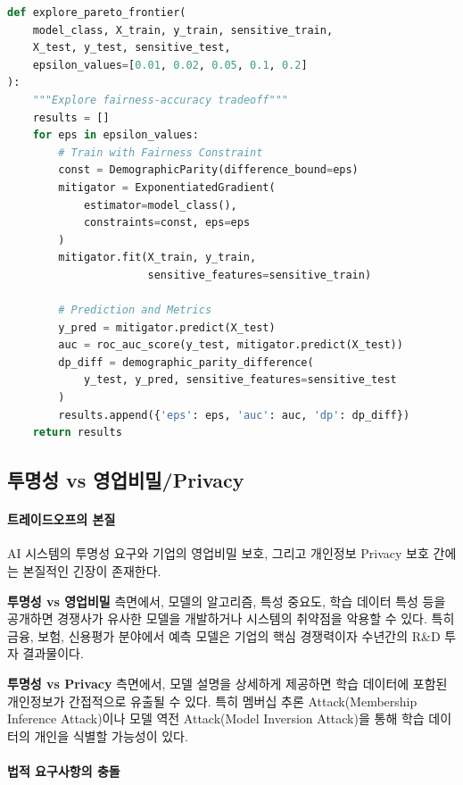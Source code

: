 \begin{lstlisting}[language=Python, caption={Pareto Frontier Exploration}, label={lst:pareto_search}]
def explore_pareto_frontier(
    model_class, X_train, y_train, sensitive_train,
    X_test, y_test, sensitive_test,
    epsilon_values=[0.01, 0.02, 0.05, 0.1, 0.2]
):
    """Explore fairness-accuracy tradeoff"""
    results = []
    for eps in epsilon_values:
        # Train with Fairness Constraint
        const = DemographicParity(difference_bound=eps)
        mitigator = ExponentiatedGradient(
            estimator=model_class(),
            constraints=const, eps=eps
        )
        mitigator.fit(X_train, y_train, 
                      sensitive_features=sensitive_train)
        
        # Prediction and Metrics
        y_pred = mitigator.predict(X_test)
        auc = roc_auc_score(y_test, mitigator.predict(X_test))
        dp_diff = demographic_parity_difference(
            y_test, y_pred, sensitive_features=sensitive_test
        )
        results.append({'eps': eps, 'auc': auc, 'dp': dp_diff})
    return results
\end{lstlisting}


\subsection{투명성 vs 영업비밀/Privacy}
\label{sec:3.2.2}

\paragraph{트레이드오프의 본질}

AI 시스템의 투명성 요구와 기업의 영업비밀 보호, 
그리고 개인정보 Privacy 보호 간에는 본질적인 긴장이 존재한다.

\textbf{투명성 vs 영업비밀} 측면에서, 
모델의 알고리즘, 특성 중요도, 학습 데이터 특성 등을 공개하면 
경쟁사가 유사한 모델을 개발하거나 시스템의 취약점을 악용할 수 있다. 
특히 금융, 보험, 신용평가 분야에서 예측 모델은 
기업의 핵심 경쟁력이자 수년간의 R\&D 투자 결과물이다.

\textbf{투명성 vs Privacy} 측면에서, 
모델 설명을 상세하게 제공하면 학습 데이터에 포함된 
개인정보가 간접적으로 유출될 수 있다. 
특히 멤버십 추론 Attack(Membership Inference Attack)이나 
모델 역전 Attack(Model Inversion Attack)을 통해 
학습 데이터의 개인을 식별할 가능성이 있다.


\paragraph{법적 요구사항의 충돌}

